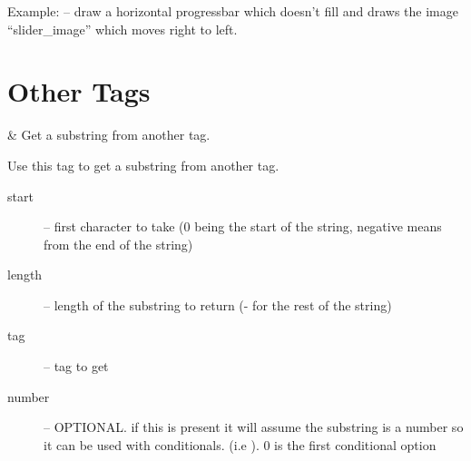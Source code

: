 Example:  -- draw
a horizontal progressbar which doesn't fill and draws the image
``slider\_image'' which moves right to left.


\section{Other Tags}

\begin{tagmap}
   & Get a substring from another tag.\\
\end{tagmap}
    Use this tag to get a substring from another tag.
\begin{description}
    \item[start] -- first character to take (0 being the start of the string, negative means from the end of the string)
    \item[length] -- length of the substring to return (- for the rest of the string)
    \item[tag] -- tag to get
    \item[number] -- OPTIONAL. if this is present it will assume the
            substring is a number so it can be used with conditionals. (i.e ).
            0 is the first conditional option
\end{description}

